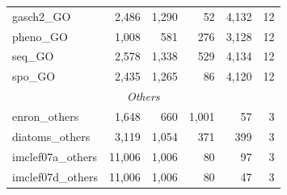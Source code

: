 \begin{table}[H]
\begin{tabular}{lrrrrr}
gasch2\_GO    & 2,486 & 1,290 & 52  & 4,132 & 12 \\
pheno\_GO     & 1,008 & 581   & 276 & 3,128 & 12 \\
seq\_GO       & 2,578 & 1,338 & 529 & 4,134 & 12 \\
spo\_GO       & 2,435 & 1,265 & 86  & 4,120 & 12 \\
\midrule
\multicolumn{6}{c}{\textit{Others}} \\
enron\_others      & 1,648  & 660   & 1,001 & 57   & 3 \\
diatoms\_others    & 3,119  & 1,054 & 371   & 399  & 3 \\
imclef07a\_others  & 11,006 & 1,006 & 80    & 97   & 3 \\
imclef07d\_others  & 11,006 & 1,006 & 80    & 47   & 3 \\
\bottomrule
\end{tabular}
\end{table}
